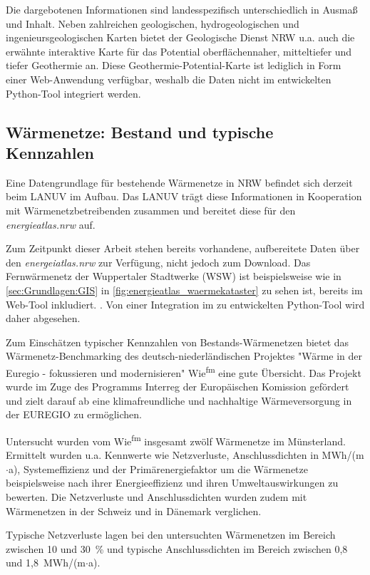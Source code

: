 			Die dargebotenen Informationen sind landesspezifisch unterschiedlich in Ausmaß und Inhalt. Neben zahlreichen geologischen, hydrogeologischen und ingenieursgeologischen Karten bietet der Geologische Dienst NRW u.a. auch die erwähnte interaktive Karte für das Potential oberflächennaher, mitteltiefer und tiefer Geothermie an. Diese Geothermie-Potential-Karte ist lediglich in Form einer Web-Anwendung verfügbar, weshalb die Daten nicht im entwickelten Python-Tool integriert werden. \cite{web_geothermie_standortcheck_nrw}
			
			
			
		\subsection{Wärmenetze: Bestand und typische Kennzahlen}
			Eine Datengrundlage für bestehende Wärmenetze in NRW befindet sich derzeit beim LANUV im Aufbau. Das LANUV trägt diese Informationen in Kooperation mit Wärmenetzbetreibenden zusammen und bereitet diese für den \textit{energieatlas.nrw} auf. \cite{web_lanuv_klima}
			
			Zum Zeitpunkt dieser Arbeit stehen bereits vorhandene, aufbereitete Daten über den \textit{energeiatlas.nrw} zur Verfügung, nicht jedoch zum Download. Das Fernwärmenetz der Wuppertaler Stadtwerke (WSW) ist beispielsweise wie in \autoref{sec:Grundlagen:GIS} in \autoref{fig:energieatlas_waermekataster} zu sehen ist, bereits im Web-Tool inkludiert. \cite{web_energieatlas}. Von einer Integration im zu entwickelten Python-Tool wird daher abgesehen.
		
			Zum Einschätzen typischer Kennzahlen von Bestands-Wärmenetzen bietet das Wärmenetz-Benchmarking des deutsch-niederländischen Projektes "Wärme in der Euregio - fokussieren und modernisieren" Wie\textsuperscript{fm} eine gute Übersicht. Das Projekt wurde im Zuge des Programms Interreg der Europäischen Komission gefördert und zielt darauf ab \frqq eine klimafreundliche und nachhaltige Wärmeversorgung in der EUREGIO zu ermöglichen.\frqq \cite{web_wiefm} 
			
			Untersucht wurden vom Wie\textsuperscript{fm} insgesamt zwölf Wärmenetze im Münsterland. Ermittelt wurden u.a. Kennwerte wie Netzverluste, Anschlussdichten in MWh/(m$\cdot$a), Systemeffizienz und der Primärenergiefaktor um die Wärmenetze beispielsweise nach ihrer Energieeffizienz und ihren Umweltauswirkungen zu bewerten. Die Netzverluste und Anschlussdichten wurden zudem mit Wärmenetzen in der Schweiz und in Dänemark verglichen. \cite{web_wiefm}
			
			Typische Netzverluste lagen bei den untersuchten Wärmenetzen im Bereich zwischen 10 und 30~\% und typische Anschlussdichten im Bereich zwischen 0,8 und 1,8~MWh/(m$\cdot$a). \cite{web_wiefm} 